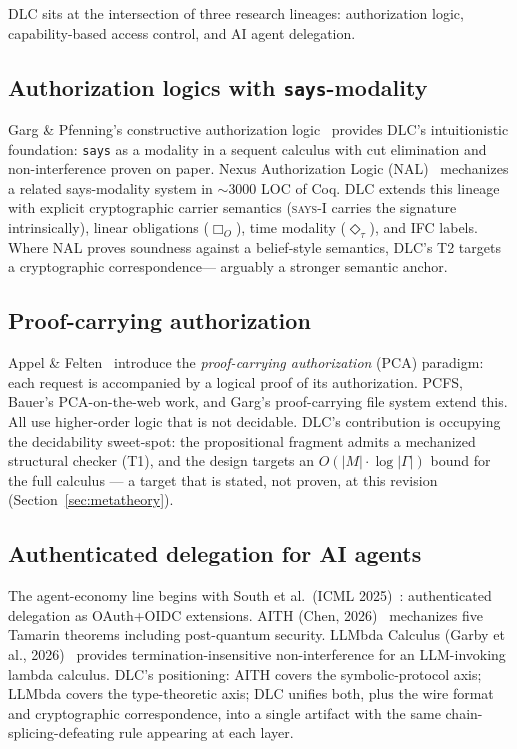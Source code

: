 
DLC sits at the intersection of three research lineages: authorization
logic, capability-based access control, and AI agent delegation.

\subsection{Authorization logics with \texttt{says}-modality}

Garg \& Pfenning's constructive authorization logic~\cite{garg2006csf}
provides DLC's intuitionistic foundation: \texttt{says} as a modality
in a sequent calculus with cut elimination and non-interference proven
on paper.  Nexus Authorization Logic (NAL)~\cite{schneider2011nal}
mechanizes a related says-modality system in $\sim$3000 LOC of Coq.
DLC extends this lineage with explicit cryptographic carrier
semantics (\textsc{says-I} carries the signature intrinsically),
linear obligations ($\Box_O$), time modality ($\Diamond_\tau$), and
IFC labels.  Where NAL proves soundness against a belief-style
semantics, DLC's T2 targets a cryptographic correspondence---
arguably a stronger semantic anchor.

\subsection{Proof-carrying authorization}

Appel \& Felten~\cite{appel1999pcfs} introduce the
\emph{proof-carrying authorization} (PCA) paradigm: each request is
accompanied by a logical proof of its authorization.  PCFS, Bauer's
PCA-on-the-web work, and Garg's proof-carrying file system extend
this.  All use higher-order logic that is not decidable.  DLC's
contribution is occupying the decidability sweet-spot: the
propositional fragment admits a mechanized structural checker (T1),
and the design targets an $O(|M| \cdot \log |\Gamma|)$ bound for the
full calculus --- a target that is stated, not proven, at this
revision (Section~\ref{sec:metatheory}).

\subsection{Authenticated delegation for AI agents}

The agent-economy line begins with South et al.~(ICML
2025)~\cite{south2025authdelegation}: authenticated delegation as
OAuth+OIDC extensions.  AITH (Chen,
2026)~\cite{chen2026aith} mechanizes five Tamarin theorems
including post-quantum security.  LLMbda Calculus (Garby et al.,
2026)~\cite{garby2026llmbda} provides termination-insensitive
non-interference for an LLM-invoking lambda calculus.  DLC's
positioning: AITH covers the symbolic-protocol axis; LLMbda covers
the type-theoretic axis; DLC unifies both, plus the wire format and
cryptographic correspondence, into a single artifact with the
same chain-splicing-defeating rule appearing at each layer.

